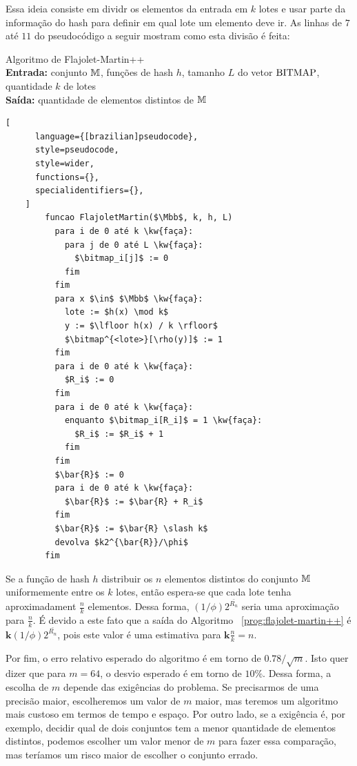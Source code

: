 Essa ideia consiste em dividr os elementos da entrada em $k$ lotes e usar parte da informação do hash para definir em 
qual lote um elemento deve ir. 
As linhas de $7$ até $11$ do pseudocódigo a seguir mostram como esta divisão é feita:
\begin{programruledcaption}{
  Algoritmo de Flajolet-Martin++
  \\ \textbf{Entrada:} conjunto $\mathbb{M}$, funções de hash $h$, tamanho $L$ do vetor $\text{BITMAP}$, 
  quantidade $k$ de lotes
  \\ \textbf{Saída:} quantidade de elementos distintos de $\mathbb{M}$
  \label{prog:flajolet-martin++}
  }
    \begin{lstlisting}[
      language={[brazilian]pseudocode},
      style=pseudocode,
      style=wider,
      functions={},
      specialidentifiers={},
    ]
        funcao FlajoletMartin($\Mbb$, k, h, L)
          para i de 0 até k \kw{faça}:
            para j de 0 até L \kw{faça}:
              $\bitmap_i[j]$ := 0
            fim
          fim
          para x $\in$ $\Mbb$ \kw{faça}:
            lote := $h(x) \mod k$
            y := $\lfloor h(x) / k \rfloor$
            $\bitmap^{<lote>}[\rho(y)]$ := 1
          fim
          para i de 0 até k \kw{faça}:
            $R_i$ := 0
          fim
          para i de 0 até k \kw{faça}:
            enquanto $\bitmap_i[R_i]$ = 1 \kw{faça}:
              $R_i$ := $R_i$ + 1
            fim
          fim
          $\bar{R}$ := 0
          para i de 0 até k \kw{faça}:
            $\bar{R}$ := $\bar{R} + R_i$ 
          fim
          $\bar{R}$ := $\bar{R} \slash k$
          devolva $k2^{\bar{R}}/\phi$
        fim
    \end{lstlisting}
  \end{programruledcaption}

Se a função de hash $h$ distribuir os $n$ elementos distintos do conjunto $\mathbb{M}$ uniformemente entre os 
$k$ lotes, então espera-se que cada lote tenha aproximadament $\frac{n}{k}$ elementos. Dessa forma, 
$(1 / \phi)2^{\bar{R_n}}$ seria uma aproximação para $\frac{n}{k}$. É devido a este fato que a saída do Algoritmo~
\ref{prog:flajolet-martin++} é $\mathbf{k} (1 / \phi)2^{\bar{R_n}}$, pois este valor é uma estimativa para 
$\mathbf{k} \frac{n}{k} = n$.

Por fim, o erro relativo esperado do algoritmo  é em torno de $0.78 / \sqrt{m}$. Isto quer 
dizer que para $m = 64$, o desvio esperado é em torno de $10\%$. Dessa forma, a escolha de $m$ depende das exigências do 
problema. Se precisarmos de uma precisão maior, escolheremos um valor de $m$  maior, mas teremos um algoritmo mais 
custoso em termos de tempo e espaço. Por outro lado, se a exigência é, por exemplo, decidir qual de dois conjuntos tem a 
menor quantidade de elementos distintos, podemos escolher um valor menor de $m$ para fazer essa comparação, mas teríamos 
um risco maior de escolher o conjunto errado.

